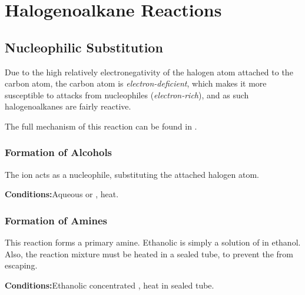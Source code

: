	\pagebreak
	\section{Halogenoalkane Reactions}

		\subsection{Nucleophilic Substitution}

			Due to the high relatively electronegativity of the halogen atom attached to the carbon atom, the carbon atom is
			\textit{electron-deficient}, which makes it more susceptible to attacks from nucleophiles (\textit{electron-rich}), and
			as such halogenoalkanes are fairly reactive.

			The full mechanism of this reaction can be found in \hyperlink{AppendixNucleophilicSubstitution}{}.

			\subsubsection{Formation of Alcohols}

				The  ion acts as a nucleophile, substituting the attached halogen atom.

				\vspace{1.5em}
				\vbox{\textbf{Conditions:}\tabto{35mm}Aqueous  or , heat.}

				\diagram[1.0]{
					\schemestart[0, 1.5, thick]
						\chemfig{!\molR-[:0]!\molX}
						\hspace{2mm} + \hspace{2mm}
						\chemfig{!\molOH\mch}
						\arrow
						\chemfig{!\molR-[:0]!\molOH}
						\hspace{2mm} + \hspace{2mm}
						\chemfig{!\molX\mch}
					\schemestop
				}


			\hypertarget{NucleophilicSubstitutionFormingAmines}{}
			\subsubsection{Formation of Amines}

				This reaction forms a primary amine. Ethanolic  is simply a solution of  in ethanol. Also, the reaction
				mixture must be heated in a sealed tube, to prevent the  from escaping.

				\vspace{1.5em}
				\vbox{\textbf{Conditions:}\tabto{35mm}Ethanolic concentrated , heat in sealed tube.}

